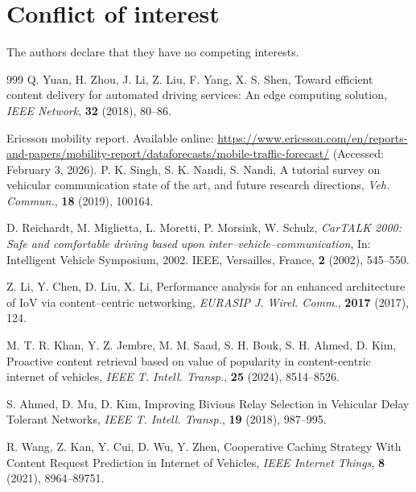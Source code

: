 \documentclass{aims}
\numberwithin{equation}{section}
\begin{document}
\section*{Conflict of interest}
The authors declare that they have no competing interests.
\newpage
\begin{thebibliography}{999}
 Q. Yuan, H. Zhou, J. Li, Z. Liu, F. Yang, X. S. Shen,  Toward efficient content delivery for automated driving services: An edge computing solution, \emph{IEEE Network}, \textbf{32} (2018), 80--86. 

 Ericsson mobility report. Available online: \url{https://www.ericsson.com/en/reports-and-papers/mobility-report/dataforecasts/mobile-traffic-forecast/} (Accessed: February 3, 2026).
 P. K. Singh, S. K. Nandi, S. Nandi, A tutorial survey on vehicular communication state of the art, and future research directions, \emph{Veh. Commun.}, \textbf{18} (2019), 100164. 

 D. Reichardt, M. Miglietta, L. Moretti, P. Morsink, W. Schulz,  \emph{CarTALK 2000: Safe and comfortable driving based upon inter--vehicle--communication}, In: Intelligent Vehicle Symposium, 2002. IEEE, Versailles, France, \textbf{2} (2002), 545--550. 

 Z. Li, Y. Chen, D. Liu, X. Li, Performance analysis for an enhanced architecture of IoV via content--centric networking, \emph{EURASIP J. Wirel. Comm.}, \textbf{2017} (2017), 124. 

 M. T. R. Khan, Y. Z. Jembre, M. M. Saad, S. H. Bouk, S. H. Ahmed, D. Kim, Proactive content retrieval based on value of popularity in content-centric internet of vehicles,  \emph{IEEE T. Intell. Transp.}, \textbf{25} (2024), 8514--8526.  

 S. Ahmed, D. Mu, D. Kim, Improving Bivious Relay Selection in Vehicular Delay Tolerant Networks, \emph{IEEE T. Intell. Transp.}, \textbf{19} (2018), 987--995. 

 R. Wang, Z. Kan, Y. Cui, D. Wu, Y. Zhen, Cooperative Caching Strategy With Content Request Prediction in Internet of Vehicles, \emph{IEEE Internet  Things}, \textbf{8} (2021), 8964--89751. 



\end{thebibliography}
\end{document}
